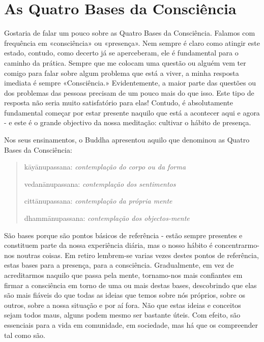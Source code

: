 \chapter{As Quatro Bases da Consciência}

Gostaria de falar um pouco sobre as Quatro Bases da Consciência. Falamos
com frequência em «consciência» ou «presença». Nem sempre é claro como
atingir este estado, contudo, como decerto já se aperceberam, ele é
fundamental para o caminho da prática. Sempre que me colocam uma questão
ou alguém vem ter comigo para falar sobre algum problema que está a
viver, a minha resposta imediata é sempre «Consciência.» Evidentemente,
a maior parte das questões ou dos problemas das pessoas precisam de um
pouco mais do que isso. Este tipo de resposta não seria muito
satisfatório para elas! Contudo, é absolutamente fundamental começar por
estar presente naquilo que está a acontecer aqui e agora - e este é o
grande objectivo da nossa meditação: cultivar o hábito de presença.

Nos seus ensinamentos, o Buddha apresentou aquilo que denominou as
Quatro Bases da Consciência:

\begin{quote}
  kāyānupassana: \emph{contemplação do corpo ou da forma}

  vedanānupassana: \emph{contemplação dos sentimentos}

  cittānupassana: \emph{contemplação da própria mente}

  dhammānupassana: \emph{contemplação dos objectos-mente}
\end{quote}

São bases porque são pontos básicos de referência - estão sempre
presentes e constituem parte da nossa experiência diária, mas o nosso
hábito é concentrarmo-nos noutras coisas. Em retiro lembrem-se varias
vezes destes pontos de referência, estas bases para a presença, para a
consciência. Gradualmente, em vez de acreditarmos naquilo que passa pela
mente, tornamo-nos mais confiantes em firmar a consciência em torno de
uma ou mais destas bases, descobrindo que elas são mais fiáveis do que
todas as ideias que temos sobre nós próprios, sobre os outros, sobre a
nossa situação e por aí fora. Não que estas ideias e conceitos sejam
todos maus, alguns podem mesmo ser bastante úteis. Com efeito, são
essenciais para a vida em comunidade, em sociedade, mas há que os
compreender tal como são.

